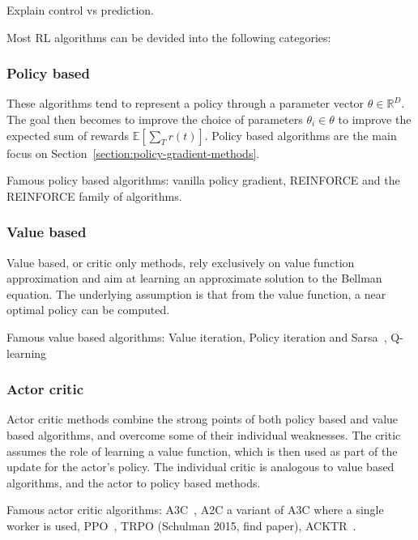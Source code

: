 \documentclass{../main.tex}{subfiles}
\begin{document}

Explain control vs prediction.

Most RL algorithms can be devided into the following categories:
\subsubsection{Policy based}
These algorithms tend to represent a policy through a parameter vector $\theta
\in \mathbb{R}^D$. The goal then becomes to improve the choice of parameters
$\theta_i \in \theta$ to improve the expected sum of rewards
$\mathbb{E}[\sum_{T} r(t)]$. Policy based algorithms are the main focus on Section~\ref{section:policy-gradient-methods}.

Famous policy based algorithms: vanilla policy gradient, REINFORCE\citep{Williams1992} and the REINFORCE family of algorithms\@.

\subsubsection{Value based}
Value based, or critic only methods, rely exclusively on value function approximation and aim at learning an approximate solution to the Bellman equation. The underlying assumption is that from the value function, a near optimal policy can be computed.

Famous value based algorithms: Value iteration, Policy iteration and Sarsa~\cite{Sutton1998}, Q-learning~\citep{Watkins1989}

\subsubsection{Actor critic}

Actor critic methods combine the strong points of both policy based and value based algorithms, and overcome some of their individual weaknesses. The critic assumes the role of learning a value function, which is then used as part of the update for the actor's policy. The individual critic is analogous to value based algorithms, and the actor to policy based methods.

Famous actor critic algorithms: A3C~\citep{Mnih2016}, A2C a variant of A3C where a single worker is used, PPO~\citep{Schulman2017}, TRPO (Schulman 2015, find paper), ACKTR~\citep{Wu2017}.
\end{document}
